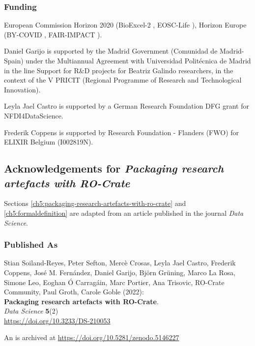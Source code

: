 \subsubsection*{Funding}

European Commission Horizon 2020 (BioExcel-2
, EOSC-Life
), Horizon
Europe (BY-COVID
,
FAIR-IMPACT
).

Daniel Garijo is supported by the Madrid Government (Comunidad de
Madrid-Spain) under the Multiannual Agreement with Universidad
Politécnica de Madrid in the line Support for R\&D projects for Beatriz
Galindo researchers, in the context of the V PRICIT (Regional Programme
of Research and Technological Innovation).

Leyla Jael Castro is supported by a German Research Foundation DFG grant
for NFDI4DataScience.

Frederik Coppens is supported by Research Foundation - Flanders (FWO)
for ELIXIR Belgium (I002819N).



\subsection{Acknowledgements for \emph{Packaging research artefacts with RO-Crate}}

Sections \vref{ch5:packaging-research-artefacts-with-ro-crate} and \vref{ch5:formaldefinition} are adapted from an article published in the journal \emph{Data Science}.

\subsubsection*{Published As}

Stian Soiland-Reyes, Peter Sefton, Mercè Crosas, Leyla Jael Castro,
Frederik Coppens, José M. Fernández, Daniel Garijo, Björn Grüning, Marco
La Rosa, Simone Leo, Eoghan Ó Carragáin, Marc Portier, Ana Trisovic,
RO-Crate Community, Paul Groth, Carole Goble (2022):\\
\textbf{Packaging research artefacts with RO-Crate}.\\
\emph{Data Science} \textbf{5}(2)\\
\url{https://doi.org/10.3233/DS-210053}

An  is archived at
\url{https://doi.org/10.5281/zenodo.5146227}

